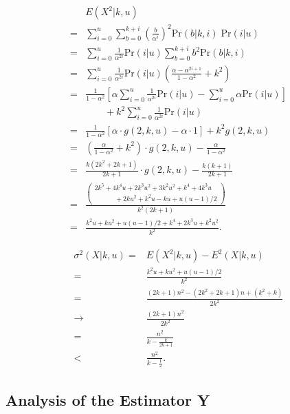 \documentclass{sig-alternate}
\begin{document}

\begin{align}
 & E(X^2 | k, u) \\
= & \sum_{i=0}^u \sum_{b=0}^{k+i} \left( \frac{b}{\alpha^i} \right)^2 \mathrm{Pr}(b|k,i) \; \mathrm{Pr}(i|u) \\
= & \sum_{i=0}^u \frac{1}{\alpha^{2i}} 
\mathrm{Pr}(i|u)
\sum_{b=0}^{k+i} b^2 
\mathrm{Pr}(b|k,i) \\
= & \sum_{i=0}^u \frac{1}{\alpha^{2i}} 
\mathrm{Pr}(i|u)
\left(  \frac{\alpha-\alpha^{2i+1}}{1-\alpha^2} + k^2  \right) \\
= & \frac{1}{1-\alpha^2} 
\left[
\alpha \sum_{i=0}^u \frac{1}{\alpha^{2i}} \mathrm{Pr}(i|u) -
\sum_{i=0}^u \alpha \mathrm{Pr}(i|u)
\right] \\
 & \quad \quad + k^2 \sum_{i=0}^u \frac{1}{\alpha^{2i}} \mathrm{Pr}(i|u) \\
= & \frac{1}{1-\alpha^2} 
\left[ \alpha \cdot g(2,k,u) - \alpha \cdot 1 \right] + k^2 g(2,k,u) \\
= & (\frac{\alpha}{1-\alpha^2} + k^2) \cdot g(2,k,u) - \frac{\alpha}{1-\alpha^2} \\
= & \frac{k(2k^2+2k+1)}{2k+1}
\cdot g(2,k,u) - 
\frac{k(k+1)}{2k+1} \\
= & \frac{
\left(\begin{array}{c}
2k^5 + 4k^4u + 2k^3u^2 + 3k^2u^2 + k^4 + 4k^3u \\
\quad \quad \quad + 2ku^2 + k^2u - ku + u(u-1)/2
\end{array}\right)
}{k^2 (2k+1)} \\
= & \frac{k^2u + ku^2 + u(u\!-\!1)/2 + k^4 + 2k^3u + k^2u^2}{k^2}.
\end{align}


\begin{align}
 \sigma^2 (X|k,u) 
 = & E(X^2|k,u) - E^2(X|k,u) \\
 = & \frac{k^2u + ku^2 + u(u\!-\!1)/2}{k^2} \\
 = & \frac{(2k+1)n^2 - (2k^2+2k+1)n + (k^2+k)}{2k^2} \\
       \rightarrow & \frac{(2k+1)n^2}{2k^2} \\
 = & \frac{n^2}{k-\frac{k}{2k+1}} \\
 < & \frac{n^2}{k-\frac{1}{2}}.
\end{align}


\subsection{Analysis of the Estimator Y}
\end{document}
